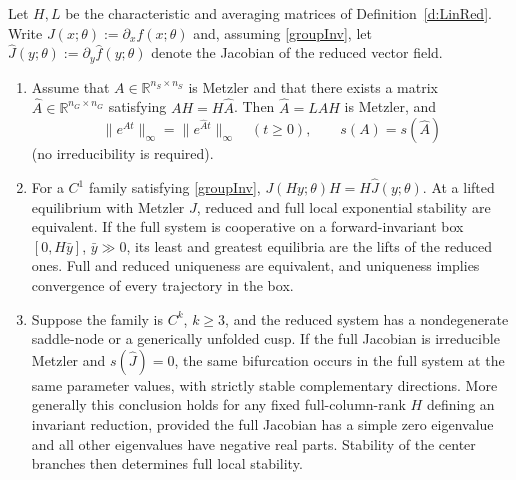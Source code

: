\label{t:KBspectral}\label{t:RedF}\label{t:KBquot}
\label{p:KBquot}\label{p:KBextremalquot}\label{t:KBbiflift}
Let $H,L$ be the characteristic and averaging matrices of
Definition~\ref{d:LinRed}. Write $J(x;\theta):=\partial_x f(x;\theta)$ and, assuming
\eqref{groupInv}, let $\widehat J(y;\theta):=\partial_y\widehat f(y;\theta)$
denote the Jacobian of the reduced vector field.
\begin{enumerate}
\item Assume that $A\in\mathbb R^{n_S\times n_S}$ is Metzler and
that there exists a matrix $\widehat A\in\mathbb R^{n_G\times n_G}$
satisfying $AH=H\widehat A$.
Then $\widehat A=LAH$ is Metzler, and
\begin{equation}\label{eq:spectral-equality}
 \|e^{At}\|_\infty=\|e^{\widehat A t}\|_\infty
 \quad(t\ge0),\qquad s(A)=s(\widehat A)
\end{equation}
(no irreducibility is required).
\item For a $C^1$ family satisfying \eqref{groupInv},
$J(Hy;\theta)H=H\widehat J(y;\theta)$.
At a lifted equilibrium with Metzler $J$, reduced and full local
exponential stability are equivalent. If the full system is cooperative
on a forward-invariant box $[0,H\bar y]$, $\bar y\gg0$, its least
and greatest equilibria are the lifts of the reduced ones. Full and
reduced uniqueness are equivalent, and uniqueness implies convergence
of every trajectory in the box.
\item Suppose the family is $C^k$, $k\ge3$, and the reduced system
has a nondegenerate saddle-node or a generically unfolded cusp.
If the full Jacobian is irreducible Metzler and
$s(\widehat J)=0$, the same bifurcation occurs in the full system
at the same parameter values, with strictly stable complementary
 directions. More generally this conclusion holds for any fixed
full-column-rank $H$ defining an invariant reduction, provided the full
Jacobian has a simple zero eigenvalue and all other eigenvalues have
negative real parts. Stability of the center branches then determines
full local stability.
\end{enumerate}
\eeT
